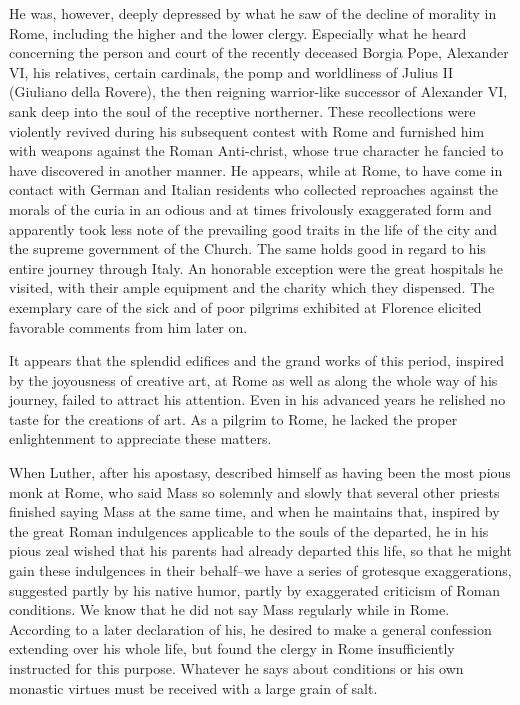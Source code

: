 He was, however, deeply depressed by what he saw of the decline
of morality in Rome, including the higher and the lower clergy.
Especially what he heard concerning the person and court of the
recently deceased Borgia Pope, Alexander VI, his relatives, certain
cardinals, the pomp and worldliness of Julius II (Giuliano della
Rovere), the then reigning warrior-like successor of Alexander VI,
sank deep into the soul of the receptive northerner. These recollections
were violently revived during his subsequent contest with
Rome and furnished him with weapons against the Roman Anti-christ,
whose true character he fancied to have discovered in another
manner. He appears, while at Rome, to have come in contact with
German and Italian residents who collected reproaches against the
morals of the curia in an odious and at times frivolously exaggerated
form and apparently took less note of the prevailing good traits
in the life of the city and the supreme government of the Church.
The same holds good in regard to his entire journey through Italy.
An honorable exception were the great hospitals he visited, with
their ample equipment and the charity which they dispensed. The
exemplary care of the sick and of poor pilgrims exhibited at Florence
elicited favorable comments from him later on.

It appears that the splendid edifices and the grand works of this
period, inspired by the joyousness of creative art, at Rome as well as
along the whole way of his journey, failed to attract his attention.
Even in his advanced years he relished no taste for the creations of art.
As a pilgrim to Rome, he lacked the proper enlightenment to appreciate
these matters.

When Luther, after his apostasy, described himself as having been
the most pious monk at Rome, who said Mass so solemnly and slowly
that several other priests finished saying Mass at the same time, and
when he maintains that, inspired by the great Roman indulgences
applicable to the souls of the departed, he in his pious zeal wished
that his parents had already departed this life, so that he might gain
these indulgences in their behalf--we have a series of grotesque exaggerations,
suggested partly by his native humor, partly by exaggerated
criticism of Roman conditions. We know that he did not say
Mass regularly while in Rome. According to a later declaration
of his, he desired to make a general confession extending over
his whole life, but found the clergy in Rome insufficiently instructed
for this purpose. Whatever he says about conditions or his own
monastic virtues must be received with a large grain of salt.

